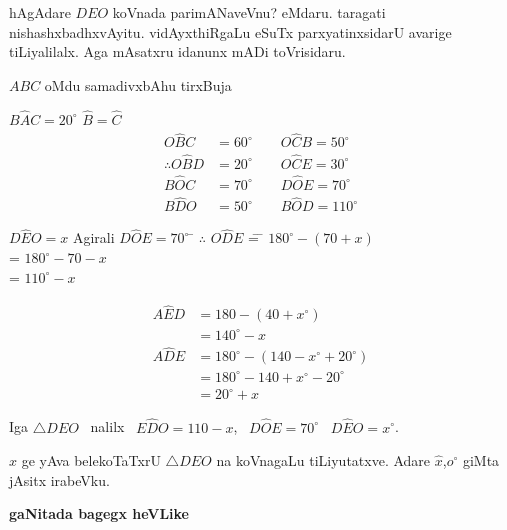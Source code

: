 hAgAdare $DEO$ koVnada parimANaveVnu? eMdaru. taragati nishashxbadhxvAyitu. vidAyxthiRgaLu eSuTx parxyatinxsidarU avarige tiLiyalilalx. Aga mAsatxru idanunx mADi toVrisidaru.

$ABC$ \quad oMdu samadivxbAhu tirxBuja

$B\widehat{A}C=20^\circ$ \qquad $\widehat{B}=\widehat{C}$
\begin{align*}
O\widehat{B}C &=60^\circ  \qquad O\widehat{C}B =50^\circ\\
\therefore O\widehat{B}D  &=20^\circ  \qquad O\widehat{C}E =30^\circ\\
B\widehat{O}C &=70^\circ   \qquad D\widehat{O}E =70^\circ\\
B\widehat{D}O &=50^\circ   \qquad B\widehat{O}D =110^\circ
\end{align*}

\begin{tabbing}
$D\widehat{E}O=x$  \; \; Agirali \;\; $D\widehat{O}E=70^\circ$ \;\; \= $\therefore$ \;\; $O\widehat{D}E$ \= = \= $180^\circ-(70+x)$\\
\> \> = \> $180^\circ-70-x$\\
\> \> = \> $110^\circ-x$
\end{tabbing}

\newpage
\phantom{a}

\vskip -1.1cm

\begin{align*}
A\widehat{E}D &=180-(40+x^\circ)\\
&=140^\circ-x\\
A\widehat{D}E & =180^\circ-(140-x^\circ+20^\circ)\\
&=180^\circ-140+x^\circ-20^\circ\\
& =20^\circ+x
\end{align*} 

Iga $\bigtriangleup DEO$~ nalilx~ $E\widehat{D}O=110-x$,~ $D\widehat{O}E=70^\circ$~ $D\widehat{E}O=x^\circ$.

$x$ ge yAva belekoTaTxrU $\bigtriangleup DEO$ na koVnagaLu tiLiyutatxve. Adare  $\widehat{x}$,\break $o^\circ$ giMta jAsitx irabeVku.

\begin{center}
{\bf gaNitada bagegx heVLike}
\end{center}

